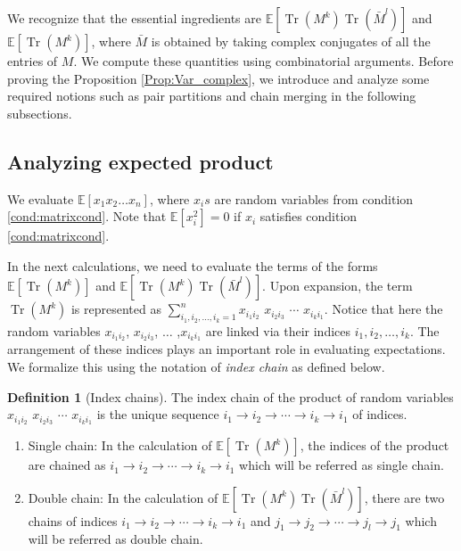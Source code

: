 \documentclass[12pt]{amsart}
\theoremstyle{plain}
\theoremstyle{definition}
\newtheorem{defn}[Thm]{Definition}
\newcommand{\Tr}{\operatorname{Tr}}
\begin{document}
We recognize that the essential ingredients are $\mathbb{E}[\Tr(M^{k})\Tr(\bar{M}^{l})]$ and $\mathbb{E}[\Tr(M^{k})]$, where $\bar M$ is obtained by taking complex conjugates of all the entries of $M$. We compute these quantities using combinatorial arguments.
Before proving the Proposition \ref{Prop:Var_complex}, we introduce and analyze some required notions such as pair partitions and chain merging in the following subsections.

\subsection{Analyzing expected product}
We evaluate $\mathbb{E}\left[x_1 x_2 \ldots x_n\right]$, where $x_is$  are random variables from condition \eqref{cond:matrixcond}. Note that $\mathbb{E}[x_i^2] = 0$ if $x_i$ satisfies condition \eqref{cond:matrixcond}.


In the next calculations, we need to evaluate the terms of the forms $\mathbb{E}[\Tr(M^{k})]$ and $\mathbb{E}[\Tr(M^{k})\Tr(\bar{M}^{l})]$. Upon expansion, the term $\Tr(M^{k})$ is represented as $\sum_{i_{1}, i_{2}, \ldots, i_{k}=1}^{n}x_{i_{1}i_{2}}$ $x_{i_{2}i_{3}}$ $\cdots$ $ x_{i_{k}i_{1}}$. Notice that here the random variables $x_{i_{1}i_{2}}$, $x_{i_{2}i_{3}}$, $\dots$ ,$ x_{i_{k}i_{1}}$ are linked via their indices $i_{1}, i_{2}, \ldots, i_{k}$. The arrangement of these indices plays an important role in evaluating expectations. We formalize this using the notation of \textit{index chain} as defined below.

\begin{defn}[Index chains]
The index chain of the product of random variables $x_{i_{1}i_{2}}$ $x_{i_{2}i_{3}}$ $\cdots$ $ x_{i_{k}i_{1}}$ is the unique sequence $i_{1}\to i_{2}\to\cdots\to i_{k}\to i_{1}$ of indices.
    \begin{enumerate}[label=(\alph*)]
        \item Single chain: In the calculation of $\mathbb{E}[\Tr(M^{k})]$, the indices of the product are chained as $i_{1}\to i_{2}\to\cdots\to i_{k}\to i_{1}$ which will be referred as single chain.
        \item Double chain: In the calculation of $\mathbb{E}[\Tr(M^{k})\Tr(\bar{M}^{l})]$, there are two chains of indices $i_{1}\to i_{2}\to \cdots\to i_{k}\to i_{1}$ and $j_{1}\to j_{2}\to \cdots\to j_{l}\to j_{1}$ which will be referred as double chain.
    \end{enumerate}
\end{defn}
\end{document}
